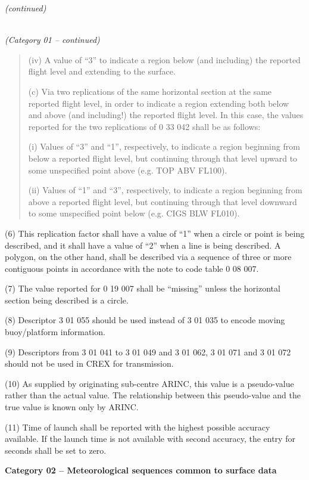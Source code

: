 \emph{(continued)}

\emph{\\
(Category 01 -- continued)}

\begin{quote}
(iv) A value of ``3'' to indicate a region below (and including) the reported flight level and extending to the surface.

(c) Via two replications of the same horizontal section at the same reported flight level, in order to indicate a region extending both below and above (and including!) the reported flight level. In this case, the values reported for the two replications of 0 33 042 shall be as follows:

(i) Values of ``3'' and ``1'', respectively, to indicate a region beginning from below a reported flight level, but continuing through that level upward to some unspecified point above (e.g. TOP ABV FL100).

(ii) Values of ``1'' and ``3'', respectively, to indicate a region beginning from above a reported flight level, but continuing through that level downward to some unspecified point below (e.g. CIGS BLW FL010).
\end{quote}

(6) This replication factor shall have a value of ``1'' when a circle or point is being described, and it shall have a value of ``2'' when a line is being described. A polygon, on the other hand, shall be described via a sequence of three or more contiguous points in accordance with the note to code table 0 08 007.

(7) The value reported for 0 19 007 shall be ``missing'' unless the horizontal section being described is a circle.

(8) Descriptor 3 01 055 should be used instead of 3 01 035 to encode moving buoy/platform information.

(9) Descriptors from 3 01 041 to 3 01 049 and 3 01 062, 3 01 071 and 3 01 072 should not be used in CREX for transmission.

(10) As supplied by originating sub-centre ARINC, this value is a pseudo-value rather than the actual value. The relationship between this pseudo-value and the true value is known only by ARINC.

(11) Time of launch shall be reported with the highest possible accuracy available. If the launch time is not available with second accuracy, the entry for seconds shall be set to zero.

\textbf{Category 02 -- Meteorological sequences common to surface data}

